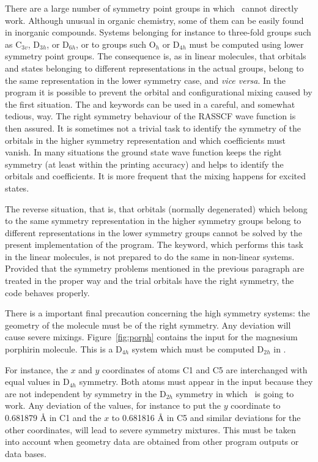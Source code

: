 There are a large number of symmetry point groups in which \molcas\
cannot directly work. Although unusual in organic chemistry, some
of them can be easily found in inorganic compounds. Systems belonging
for instance to three-fold groups such as C$_{3v}$, D$_{3h}$, or D$_{6h}$,
or to groups such O$_h$ or D$_{4h}$ must be computed using lower symmetry
point groups. The consequence is, as in linear molecules, that 
orbitals and states belonging to different representations in the
actual groups, belong to the same representation in the lower symmetry
case, and {\em vice versa}. In the \program{RASSCF} program it is 
possible to prevent the orbital and configurational mixing caused by
the first situation. The \keyword{CLEAnup} and \keyword{SUPSymmetry}
keywords can be used in a careful, and somewhat tedious, way. The right
symmetry behaviour of the RASSCF wave function is then assured. It is
sometimes not a trivial task to identify the symmetry of the orbitals
in the higher symmetry representation and which coefficients must vanish.
In many situations the ground state wave function keeps the right
symmetry (at least within the printing accuracy) and helps to identify
the orbitals and coefficients. It is more frequent that the mixing
happens for excited states.

The reverse situation, that is, that orbitals (normally degenerated) which
belong to the same symmetry representation in the higher symmetry groups
belong to different representations in the lower symmetry groups cannot
be solved by the present implementation of the \program{RASSCF} program.
The \keyword{AVERage} keyword, which performs this task in the linear molecules,
is not prepared to do the same in non-linear systems. Provided that the
symmetry problems mentioned in the previous paragraph are treated in
the proper way and the trial orbitals have the right symmetry, the  
code behaves properly.


There is a important final precaution concerning the high symmetry systems: 
the geometry of the molecule must be of the right symmetry. Any deviation
will cause severe mixings. Figure~\ref{fig:porph} contains the 
 input for the magnesium porphirin molecule. This is 
a D$_{4h}$ system which must be computed D$_{2h}$ in \molcas. 

For instance, the $x$ and $y$ coordinates of atoms C1 and C5
are interchanged with equal values in D$_{4h}$ symmetry. Both
atoms must appear in the  input because they
are not independent by symmetry in the D$_{2h}$ symmetry in which
\molcas\ is going to work. Any deviation of the values,
for instance to put the $y$ coordinate to 0.681879 {\AA} in C1
and the $x$ to 0.681816 {\AA} in C5 and similar deviations for the other
coordinates, will lead to severe symmetry mixtures. This must be
taken into account when geometry data are obtained from other
program outputs or data bases.

